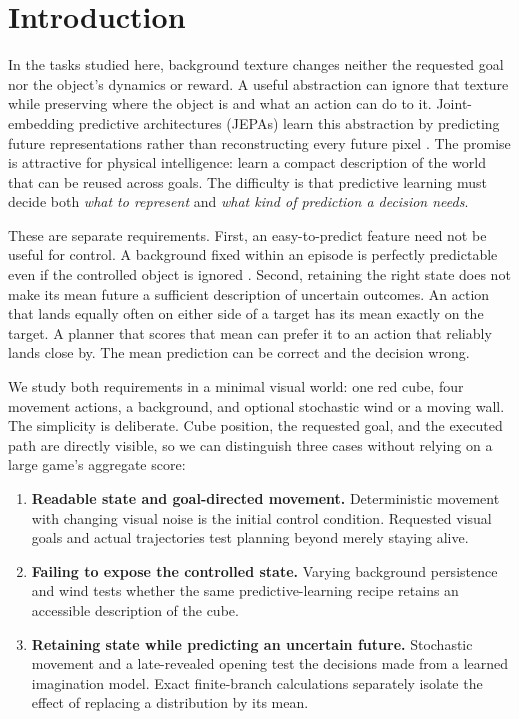 \section{Introduction}
\label{sec:intro}

In the tasks studied here, background texture changes neither the requested goal nor the object's
dynamics or reward. A useful abstraction can ignore that texture while preserving where the object
is and what an action can do to it. Joint-embedding predictive architectures (JEPAs) learn this
abstraction by predicting future representations rather than reconstructing every future pixel
\citep{lecun2022path,assran2023ijepa,bardes2024vjepa,maes2026lewm}. The promise is attractive for
physical intelligence: learn a compact description of the world that can be reused across goals.
The difficulty is that predictive learning must decide both \emph{what to represent} and
\emph{what kind of prediction a decision needs}.

These are separate requirements. First, an easy-to-predict feature need not be useful for control.
A background fixed within an episode is perfectly predictable even if the controlled object is
ignored \citep{sobal2022slow}. Second, retaining the right state does not make its mean future a
sufficient description of uncertain outcomes. An action that lands equally often on either side
of a target has its mean exactly on the target. A planner that scores that mean can prefer it to
an action that reliably lands close by. The mean prediction can be correct and the decision wrong.

We study both requirements in a minimal visual world: one red cube, four movement actions, a
background, and optional stochastic wind or a moving wall. The simplicity is deliberate. Cube
position, the requested goal, and the executed path are directly visible, so we can distinguish
three cases without relying on a large game's aggregate score:
\begin{enumerate}
\item \textbf{Readable state and goal-directed movement.} Deterministic movement with changing
visual noise is the initial control condition. Requested visual goals and actual trajectories test
planning beyond merely staying alive.
\item \textbf{Failing to expose the controlled state.} Varying background persistence and wind tests
whether the same predictive-learning recipe retains an accessible description of the cube.
\item \textbf{Retaining state while predicting an uncertain future.} Stochastic movement and a
late-revealed opening test the decisions made from a learned imagination model. Exact finite-branch
calculations separately isolate the effect of replacing a distribution by its mean.
\end{enumerate}

